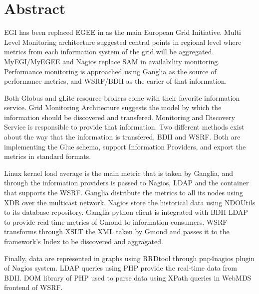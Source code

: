 \section*{Abstract}

EGI has been replaced EGEE in as the main European Grid Initiative. Multi Level Monitoring architecture suggested central points in regional level where metrics from each information system of the grid will be aggregated. MyEGI/MyEGEE and Nagios replace SAM in availability monitoring. Performance monitoring is approached using Ganglia as the source of performance metrics, and WSRF/BDII as the carier of that information.

Both Globus and gLite resource brokers come with their favorite information service. Grid Monitoring Architecture suggests the model by which the information should be discovered and transfered. Monitoring and Discovery Service is responsible to provide that information. Two different methods exist about the way that the information is transfered, BDII and WSRF. Both are implementing the Glue schema, support Information Providers, and export the metrics in standard formats.

Linux kernel load average is the main metric that is taken by Ganglia, and through the information providers is passed to Nagios, LDAP and the container that supports the WSRF. Ganglia distribute the metrics to all its nodes using XDR over the multicast network. Nagios store the historical data using NDOUtils to its database repository. Ganglia python client is integrated with BDII LDAP to provide real-time metrics of Gmond to information consumers. WSRF transforms through XSLT the XML taken by Gmond and passes it to the framework's Index to be discovered and aggragated.

Finally, data are represented in graphs using RRDtool through pnp4nagios plugin of Nagios system. LDAP queries using PHP provide the real-time data from BDII. DOM library of PHP used to parse data using XPath queries in WebMDS frontend of WSRF.

\clearpage
